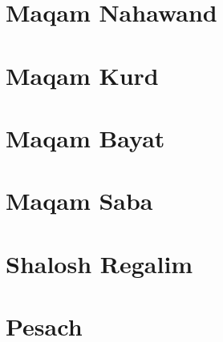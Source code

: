 \documentclass[letterpaper]{memoir}
\newcommand{\song}[2]{}
\begin{document}
\chapter{Maqam Nahawand}
\song{Malki Tzuri El Kabir}{Malki_Tzuri_El_Kabir.pdf}
\song{Lach Ana Orech}{Lach_Ana_Orech.pdf}
\song{Im HaGolan}{Im_HaGolan.pdf}
\song{Ata El Kabir}{Ata_El_Kabir.pdf}
\song{Hayyim U'Madon}{Hayyim_UMadon.pdf}
\song{L'David Shir U'Mizmor}{LDavid_Shir_uMizmor.pdf}

\chapter{Maqam Kurd}
\song{Im Ninalu}{Im_Ninalu.pdf}
\song{Eshal Elohai}{Eshal_Elohai.pdf}
\song{Yerushalyim Ir HaBirah}{Yerushalyim_Ir_HaBirah.pdf}

\chapter{Maqam Bayat}
\song{Yahaloma}{Yahaloma.pdf}
\song{Ana Chaper}{Ana_Chaper.pdf}
\song{Nagila Halleluyah}{Nagila_Halleluyah.pdf}
\song{Semach Beni B'Chelkecha}{Semach_Beni_BChelkecha.pdf}
\song{Chochmaah Binah Yah Eli}{Chochmah_Binah_Yah_Eli.pdf}
\song{Havivi Yah Havivi}{Havivi_Yah_Havivi.pdf}
\song{Yotzer MiYado}{Yotzer_MiYado_2.pdf}

\chapter{Maqam Saba}
\song{Goel Yavo}{Goel_Yavo.pdf}

\chapter{Shalosh Regalim}
\song{Mauzi}{Mauzi.pdf}
\song{Samachti Tehillim 122}{Samachti.pdf}
\song{B'tzeit Yisrael}{Btzeit_Yisrael.pdf}
\song{Aromimcha}{Aromimcha.pdf}

\chapter{Pesach}
\song{Yachid Norah}{Yachid_Norah.pdf}
\song{Rachum Atah}{Rachum_Atah.pdf}
\song{B'neh Li Zevul Mishkani}{Bneh_Li_Zevul_Mishkani.pdf}
\song{Emunim Irchu Shevach (Yerushalmi)}{Emunim_Irchu_Shevach_Yerushalyim.pdf}
\song{Emunim Irchu Shevach (Syrian)}{Emunim_Irchu_Shevach_Syrian.pdf}
\song{Mi Yimalel Gevurotecha}{Mi_Yimalel_Gevurotecha.pdf}
\song{El B'Yado}{El_BYado.pdf}
\song{Ashir laEl Ga'oh Ga'ah}{Ashir_laEl_Gaoh_Gaah.pdf}
\end{document}
